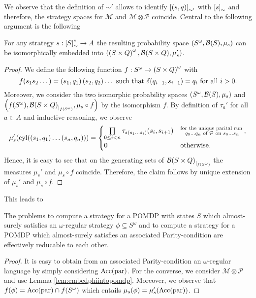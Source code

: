 We observe that the definition of $\sim'$ allows to identify
$\left[\left(s,q\right)\right]_{\sim'}$ with $\left[s\right]_{\sim}$ and therefore, the
strategy spaces for $\mathcal{M}$ and $\mathcal{M}\otimes\mathcal{P}$ coincide.
Central to the following argument is the following
\begin{lemma}
  For any strategy $s:\left[S\right]_{\sim}^{*}\rightarrow A$ the resulting
  probability space $\left(S^{\omega}, \mathcal{B}(S), \mu_{s}\right)$ can be
  isomorphically embedded into 
  $\left(\left(S\times Q\right)^{\omega}, \mathcal{B}(S\times Q), \mu_{s}'\right)$.
  \label{lem:embedphiintopomdp}
\end{lemma}
\begin{proof}
  We define the following function $f:S^{\omega}\rightarrow
  \left(S\times Q\right)^{\omega}$ with
  \begin{equation*}
    f(s_{1}s_{2}\dots) = \left(s_{1}, q_{1}\right)\left(s_{2}, q_{2}\right)\dots
    \text{ such that }
    \delta(q_{i-1}, s_{i-1}) = q_{i}\text{ for all }i>0.
  \end{equation*}
  Moreover, we consider the two isomorphic probability spaces
  $\left(S^{\omega}, \mathcal{B}(S), \mu_{s}\right)$ and 
  $\left(f(S^{\omega}), {\mathcal{B}(S\times Q)}_{|_{f(S^{\omega})}},
    \mu_{s}\circ f\right)$ by the isomorphism $f$. By definition of $\tau_{a}'$ for
  all $a\in A$ and inductive reasoning, we observe
  \begin{equation*}
    \mu_{s}'(\operatorname{cyl}(\left(s_{1}, q_{1}\right)\dots\left(s_{n}, q_{n}\right))) = 
    \begin{cases}
      \prod\limits_{0\leq i<n}\tau_{s(s_{1}\dots s_{i})}(s_{i}, s_{i+1})
        &\substack{\text{for the unique parital run }\\q_{0}\dots q_{n}
          \text{ of }\mathcal{P}\text{ on }s_{0}\dots s_{n}},\\
      0&\text{otherwise}.
    \end{cases}
  \end{equation*}
  Hence, it is easy to see that on the generating sets of
  ${\mathcal{B}(S\times Q)}_{|_{f(S^{\omega})}}$ the measures $\mu_{s}'$
  and $\mu_{s}\circ f$ coincide. Therefore, the claim follows by unique
  extension of $\mu_{s}'$ and $\mu_{s}\circ f$.
\end{proof}
This leads to
\begin{theorem}
  The problems to compute a strategy for a \ac{POMDP} with states $S$ which
  almost-surely satisfies an $\omega$-regular strategy
  $\phi\subseteq S^{\omega}$ and to compute a strategy for a \ac{POMDP} which
  almost-surely satisfies an associated Parity-condition are effectively
  reducable to each other.
  \label{thm:POMDPomegareg}
\end{theorem}
\begin{proof}
  It is easy to obtain from an associated Parity-condition an $\omega$-regular
  language by simply considering $\operatorname{Acc}(\operatorname{par})$. For the converse, we
  consider $\mathcal{M}\otimes\mathcal{P}$ and use Lemma
  \ref{lem:embedphiintopomdp}. Moreover, we observe that
  $f(\phi) = \operatorname{Acc}(\operatorname{par})\cap f(S^{\omega})$ which entails
  $\mu_{s}(\phi) = \mu_{s}'(\operatorname{Acc}(\operatorname{par}))$.
\end{proof}

